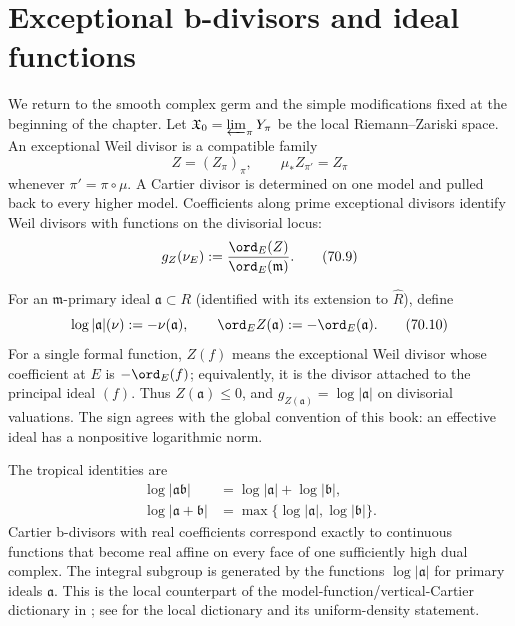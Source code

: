 

\section{Exceptional b-divisors and ideal functions}
\label{sec:local-exceptional-ideals}

We return to the smooth complex germ and the simple modifications fixed
at the beginning of the chapter.
Let $\mathfrak X_0=\varprojlim_\pi Y_\pi$ be the local
Riemann--Zariski space.  An exceptional Weil divisor is a compatible family
\[
                         Z=(Z_\pi)_\pi,
 \qquad
                         \mu_*Z_{\pi'}=Z_\pi
\tag{70.8}\label{eq:local-weil-bdivisor}
\]
whenever $\pi'=\pi\circ\mu$.  A Cartier divisor is determined on one
model and pulled back to every higher model.  Coefficients along prime
exceptional divisors identify Weil divisors with functions on the
divisorial locus:
\[
 g_Z(\nu_E)
 :=\frac{\ord_E(Z)}{\ord_E(\mathfrak m)}.
\tag{70.9}\label{eq:local-divisor-function}
\]

For an $\mathfrak m$-primary ideal $\mathfrak a\subset R$ (identified
with its extension to $\widehat R$), define
\[
 \log|\mathfrak a|(\nu):=-\nu(\mathfrak a),
 \qquad
 \ord_E Z(\mathfrak a):=-\ord_E(\mathfrak a).
\tag{70.10}\label{eq:local-ideal-function}
\]
For a single formal function, $Z(f)$ means the exceptional Weil divisor
whose coefficient at $E$ is $-\ord_E(f)$; equivalently, it is the
divisor attached to the principal ideal $(f)$.
Thus $Z(\mathfrak a)\leq0$, and
$g_{Z(\mathfrak a)}=\log|\mathfrak a|$ on divisorial valuations.
The sign agrees with the global convention of this book: an effective ideal
has a nonpositive logarithmic norm.

The tropical identities are
\[
\begin{aligned}
 \log|\mathfrak a\mathfrak b|
   &=\log|\mathfrak a|+\log|\mathfrak b|,\\
 \log|\mathfrak a+\mathfrak b|
   &=\max\{\log|\mathfrak a|,\log|\mathfrak b|\}.
\end{aligned}
\tag{70.11}\label{eq:local-tropical-ideal-laws}
\]
Cartier b-divisors with real coefficients correspond exactly to continuous
functions that become real affine on every face of one sufficiently high
dual complex.  The
integral subgroup is generated by the functions
$\log|\mathfrak a|$ for primary ideals $\mathfrak a$.  This is the
local counterpart of the model-function/vertical-Cartier dictionary in
; see
\cite[Propositions~1.14--1.15]{BFJ08} for the local dictionary and its
uniform-density statement.

